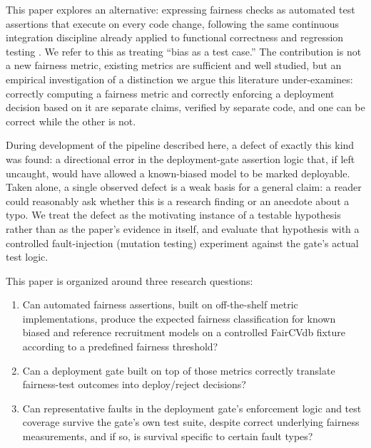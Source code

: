 \documentclass[]{einformatica}
\begin{document}
This paper explores an alternative: expressing fairness checks as automated test assertions that execute on every code change, following the same continuous integration discipline already applied to functional correctness and regression testing \cite{Fowler2006,Breck2017}. We refer to this as treating ``bias as a test case.'' The contribution is not a new fairness metric, existing metrics are sufficient and well studied, but an empirical investigation of a distinction we argue this literature under-examines: correctly computing a fairness metric and correctly enforcing a deployment decision based on it are separate claims, verified by separate code, and one can be correct while the other is not.

During development of the pipeline described here, a defect of exactly this kind was found: a directional error in the deployment-gate assertion logic that, if left uncaught, would have allowed a known-biased model to be marked deployable. Taken alone, a single observed defect is a weak basis for a general claim: a reader could reasonably ask whether this is a research finding or an anecdote about a typo. We treat the defect as the motivating instance of a testable hypothesis rather than as the paper's evidence in itself, and evaluate that hypothesis with a controlled fault-injection (mutation testing) experiment against the gate's actual test logic.

This paper is organized around three research questions:
\begin{enumerate}
\item[\textbf{RQ1.}] Can automated fairness assertions, built on off-the-shelf metric implementations, produce the expected fairness classification for known biased and reference recruitment models on a controlled FairCVdb fixture according to a predefined fairness threshold?
\item[\textbf{RQ2.}] Can a deployment gate built on top of those metrics correctly translate fairness-test outcomes into deploy/reject decisions?
\item[\textbf{RQ3.}] Can representative faults in the deployment gate's enforcement logic and test coverage survive the gate's own test suite, despite correct underlying fairness measurements, and if so, is survival specific to certain fault types?
\end{enumerate}
\end{document}
